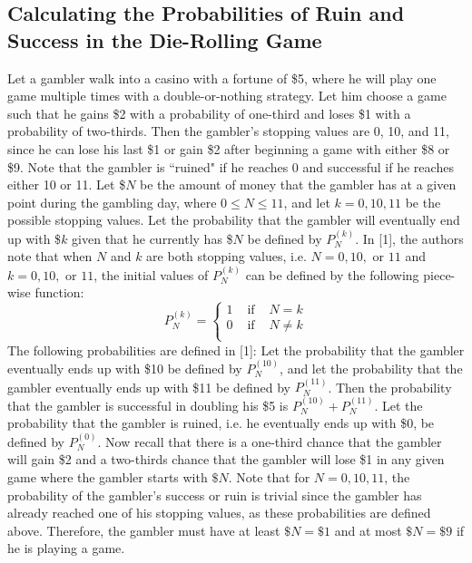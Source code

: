 \documentclass[12pt]{article}
\begin{document}
\subsection{Calculating the Probabilities of Ruin and Success in the Die-Rolling Game}
Let a gambler walk into a casino with a fortune of \$5, where he will play one game multiple times with a double-or-nothing strategy.
Let him choose a game such that he gains \$2 with a probability of one-third
and loses \$1 with a probability of two-thirds.
Then the gambler's stopping values are 0, 10, and 11, since he can lose his last \$1 or gain \$2 after beginning a game with either \$8 or \$9.
Note that the gambler is ``ruined" if he reaches 0 and successful if he reaches either 10 or 11.
\newline Let \$$N$ be the amount of money that the gambler has at a given point during the gambling day, where $0 \leq N \leq 11$, and
let $k = 0, 10, 11$ be the possible stopping values.
Let the probability that the gambler will eventually end up with \$$k$ given that he currently has \$$N$ be defined by $P^{(k)}_N$.
In [1], the authors note that when $N$ and $k$ are both stopping values, i.e. $N = 0, 10, \text{ or } 11$ and $k = 0, 10, \text{ or } 11$, the initial values of $P^{(k)}_N$ can be defined by the following piece-wise function:
$$P^{(k)}_N = 
\left\{
\begin{array}{ccc}
1 & \text{ if } & N = k \\
0 & \text{ if } & N \neq k \\
\end{array}
\right.$$
The following probabilities are defined in [1]:
Let the probability that the gambler eventually ends up with \$10 be defined by $P^{(10)}_N$, and
let the probability that the gambler eventually ends up with \$11 be defined by $P^{(11)}_N$.
Then the probability that the gambler is successful in doubling his \$5 is $P^{(10)}_N + P^{(11)}_N$.
Let the probability that the gambler is ruined, i.e. he eventually ends up with \$0, be defined by $P^{(0)}_N$.
\newline Now recall that there is a one-third chance that the gambler will gain \$2 and a two-thirds chance that the gambler will lose \$1 in any given game where the gambler starts with $\$N$. Note that for $N = 0, 10, 11$, the probability of the gambler's success or ruin is trivial since the gambler has already reached one of his stopping values, as these probabilities are defined above. Therefore, the gambler must have at least $\$N = \$1$ and at most $\$N = \$9$ if he is playing a game.
\end{document}
